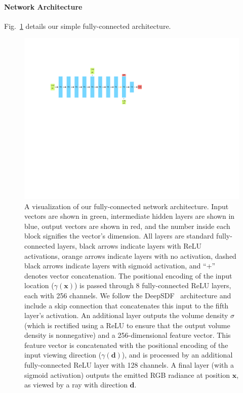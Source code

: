 \documentclass[runningheads]{llncs}
\begin{document}
\paragraph{\textbf{Network Architecture}}  
Fig.~\ref{fig:net} details our simple fully-connected architecture.


\begin{figure}[t]
\centering
\includegraphics[width=0.8\linewidth]{figs/netdiag.pdf}
\caption{A visualization of our fully-connected network architecture. Input vectors are shown in green, intermediate hidden layers are shown in blue, output vectors are shown in red, and the number inside each block signifies the vector's dimension. All layers are standard fully-connected layers, black arrows indicate layers with ReLU activations, orange arrows indicate layers with no activation, dashed black arrows indicate layers with sigmoid activation, and ``+'' denotes vector concatenation. The positional encoding of the input location ($\gamma(\mathbf{x})$) is passed through 8 fully-connected ReLU layers, each with 256 channels. We follow the DeepSDF~\cite{deepsdf} architecture and include a skip connection that concatenates this input to the fifth layer's activation. An additional layer outputs the volume density $\sigma$ (which is rectified using a ReLU to ensure that the output volume density is nonnegative) and a 256-dimensional feature vector. This feature vector is concatenated with the positional encoding of the input viewing direction ($\gamma(\mathbf{d})$), and is processed by an additional fully-connected ReLU layer with 128 channels. A final layer (with a sigmoid activation) outputs the emitted RGB radiance at position $\mathbf{x}$, as viewed by a ray with direction $\mathbf{d}$.}
\label{fig:net}
\end{figure}
\end{document}
